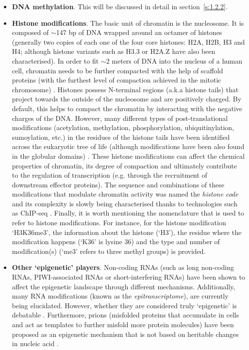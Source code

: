 \begin{itemize}
	
	\item \textbf{DNA methylation}. This will be discussed in detail in section~\ref{s:1.2.2}.
	
	\item \textbf{Histone modifications}. The basic unit of chromatin is the nucleosome. It is composed of $\sim$147 \acrshort{bp} of DNA wrapped around an octamer of histones (generally two copies of each one of the four core histones: H2A, H2B, H3 and H4; although histone variants such as H3.3 or H2A.Z have also been characterised). In order to fit  $\sim$2 meters of DNA into the nucleus of a human cell, chromatin needs to be further compacted with the help of scaffold proteins (with the furthest level of compaction achieved in the mitotic chromosome) \cite{Ou2017}. Histones possess N-terminal regions (a.k.a histone tails) that project towards the outside of the nucleosome and are positively charged. By default, this helps to compact the chromatin by interacting with the negative charges of the DNA. However, many different types of post-translational modifications (acetylation, methylation, phosphorylation, ubiquitinylation, sumoylation, etc.) in the residues of the histone tails have been identified across the eukaryotic tree of life (although modifications have been also found in the globular domains) \cite{Lawrence2016}. These histone modifications can affect the chemical properties of chromatin, its degree of compaction and ultimately contribute to the regulation of transcription (e.g. through the recruitment of downstream effector proteins). The sequence and combinations of these modifications that modulate chromatin activity was named the \textit{histone code} \cite{Strahl2000} and its complexity is slowly being characterised thanks to technologies such as \acrshort{ChIP-seq} \cite{Consortium2012, Consortium2015}. Finally, it is worth mentioning the nomenclature that is used to refer to histone modifications. For instance, for the histone modification `H3K36me3', the information about the histone (`H3'), the residue where the modification happens (`K36' is lysine 36) and the type and number of modification(s) (`me3' refers to three methyl groups) is provided.

	\item \textbf{Other `epigenetic' players}. Non-coding RNAs (such as long non-coding RNAs, PIWI-associated RNAs or short-interfering RNAs) have been shown to affect the epigenetic landscape through different mechanisms. Additionally, many RNA modifications (known as the \textit{epitranscriptome}), are currently being elucidated. However, whether they are considered truly `epigenetic' is debatable \cite{Mattick2009,Morris2014}. Furthermore, prions (misfolded proteins that accumulate in cells and act as templates to further misfold more protein molecules) have been proposed as an epigenetic mechanism that is not based on heritable changes in nucleic acid \cite{Halfmann2010}.
	
	
\end{itemize}

